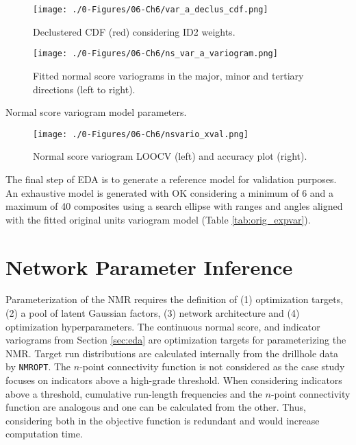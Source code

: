 \begin{figure}[htb!]
    \centering
    \texttt{[image: ./0-Figures/06-Ch6/var\_a\_declus\_cdf.png]}
    \caption{ Declustered \gls{CDF} (red) considering \gls{ID2} weights. }
    \label{fig:declus_cdf}
\end{figure}

\begin{figure}[htb!]
    \centering
    \texttt{[image: ./0-Figures/06-Ch6/ns\_var\_a\_variogram.png]}
    \caption{Fitted normal score variograms in the major, minor and tertiary directions (left to right). }
    \label{fig:ns_expvar}
\end{figure}

\begin{table}[!htb]
    \centering
    \caption{Normal score variogram model parameters.}
    \resizebox{1\width}{!}{}
    \label{tab:ns_expvar}
\end{table}

\begin{figure}[htb!]
    \centering
    \texttt{[image: ./0-Figures/06-Ch6/nsvario\_xval.png]}
    \caption{Normal score variogram \gls{LOOCV} (left) and accuracy plot (right).}
    \label{fig:ns_xval}
\end{figure}

The final step of \gls{EDA} is to generate a reference model for validation purposes. An exhaustive model is generated with \gls{OK} considering a minimum of 6 and a maximum of 40 composites using a search ellipse with ranges and angles aligned with the fitted original units variogram model (Table \ref{tab:orig_expvar}).

\FloatBarrier
\section{Network Parameter Inference}
\label{sec:param}

Parameterization of the \gls{NMR} requires the definition of (1) optimization targets, (2) a pool of latent Gaussian factors, (3) network architecture and (4) optimization hyperparameters. The continuous normal score, and indicator variograms from Section \ref{sec:eda} are optimization targets for parameterizing the \gls{NMR}. Target run distributions are calculated internally from the drillhole data by \texttt{NMROPT}. The $n$-point connectivity function is not considered as the case study focuses on indicators above a high-grade threshold. When considering indicators above a threshold, cumulative run-length frequencies and the $n$-point connectivity function are analogous and one can be calculated from the other. Thus, considering both in the objective function is redundant and would increase computation time.

